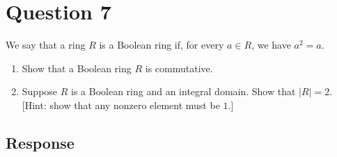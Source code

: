 \documentclass [12pt] {article}
\begin{document}
\section*{Question 7}
We say that a ring $R$ is a Boolean ring if, for every $a\in R$, we have $a^2=a$. 

\begin{enumerate}
    \item Show that a Boolean ring $R$ is commutative.
    \item Suppose $R$ is a Boolean ring and an integral domain. Show that $|R|=2$. [Hint: show that any nonzero element must be $1$.]
\end{enumerate} 
\subsection*{Response}
\end{document}
